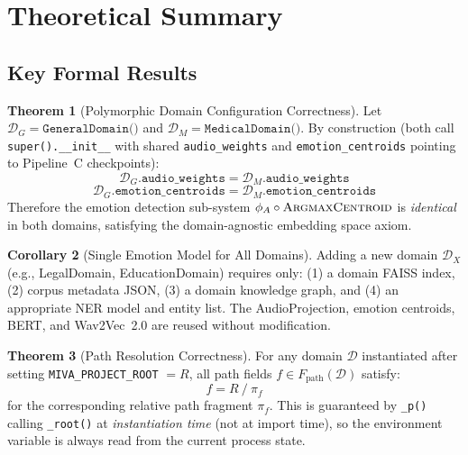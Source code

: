 \documentclass[12pt,a4paper]{article}
\theoremstyle{definition}
\newtheorem{theorem}{Theorem}[section]
\newtheorem{corollary}[theorem]{Corollary}
\theoremstyle{remark}
\begin{document}
\section{Theoretical Summary}

\subsection{Key Formal Results}

\begin{theorem}[Polymorphic Domain Configuration Correctness]
Let $\mathcal{D}_G = \texttt{GeneralDomain()}$ and
$\mathcal{D}_M = \texttt{MedicalDomain()}$.
By construction (both call \texttt{super().\_\_init\_\_} with shared
\texttt{audio\_weights} and \texttt{emotion\_centroids} pointing to
Pipeline~C checkpoints):
\[
  \mathcal{D}_G.\texttt{audio\_weights} = \mathcal{D}_M.\texttt{audio\_weights}
\]
\[
  \mathcal{D}_G.\texttt{emotion\_centroids} = \mathcal{D}_M.\texttt{emotion\_centroids}
\]
Therefore the emotion detection sub-system
$\phi_A \circ \textsc{ArgmaxCentroid}$ is \emph{identical} in both domains,
satisfying the domain-agnostic embedding space axiom.
\end{theorem}

\begin{corollary}[Single Emotion Model for All Domains]
Adding a new domain $\mathcal{D}_X$ (e.g., LegalDomain, EducationDomain)
requires only: (1) a domain FAISS index, (2) corpus metadata JSON,
(3) a domain knowledge graph, and (4) an appropriate NER model and entity
list. The AudioProjection, emotion centroids, BERT, and Wav2Vec~2.0 are
reused without modification.
\end{corollary}

\begin{theorem}[Path Resolution Correctness]
For any domain $\mathcal{D}$ instantiated after setting
\texttt{MIVA\_PROJECT\_ROOT} $= R$,
all path fields $f \in F_{\text{path}}(\mathcal{D})$ satisfy:
\[
  f = R \mathbin{/} \pi_f
\]
for the corresponding relative path fragment $\pi_f$.
This is guaranteed by \texttt{\_p()} calling \texttt{\_root()} at
\emph{instantiation time} (not at import time), so the environment
variable is always read from the current process state.
\end{theorem}
\end{document}
